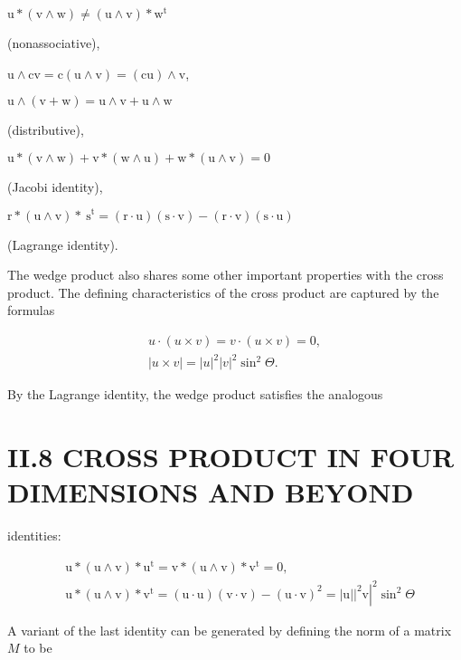 \begin{CJK}{UTF8}{gbsn}
$\mathrm{u} *(\mathrm{v} \wedge \mathrm{w}) \neq(\mathrm{u} \wedge \mathrm{v}) * \mathrm{w}^{\mathrm{t}}$

(nonassociative),

$\mathrm{u} \wedge \mathrm{cv}=\mathrm{c}(\mathrm{u} \wedge \mathrm{v})=(\mathrm{cu}) \wedge \mathrm{v}$,

$\mathrm{u} \wedge(\mathrm{v}+\mathrm{w})=\mathrm{u} \wedge \mathrm{v}+\mathrm{u} \wedge \mathrm{w}$

(distributive),

$\mathrm{u} *(\mathrm{v} \wedge \mathrm{w})+\mathrm{v} *(\mathrm{w} \wedge \mathrm{u})+\mathrm{w} *(\mathrm{u} \wedge \mathrm{v})=0$

(Jacobi identity),

$\mathrm{r} *(\mathrm{u} \wedge \mathrm{v}) * \mathrm{~s}^{\mathrm{t}}=(\mathrm{r} \cdot \mathrm{u})(\mathrm{s} \cdot \mathrm{v})-(\mathrm{r} \cdot \mathrm{v})(\mathrm{s} \cdot \mathrm{u})$

(Lagrange identity).

The wedge product also shares some other important properties with the cross product. The defining characteristics of the cross product are captured by the formulas

$$
\begin{gathered}
u \cdot(u \times v)=v \cdot(u \times v)=0, \\
|u \times v|=|u|^{2}|v|^{2} \sin ^{2} \Theta .
\end{gathered}
$$

By the Lagrange identity, the wedge product satisfies the analogous

\section{II.8 CROSS PRODUCT IN FOUR DIMENSIONS AND BEYOND}
identities:

$$
\begin{aligned}
&\mathrm{u} *(\mathrm{u} \wedge \mathrm{v}) * \mathrm{u}^{\mathrm{t}}=\mathrm{v} *(\mathrm{u} \wedge \mathrm{v}) * \mathrm{v}^{\mathrm{t}}=0, \\
&\mathrm{u} *(\mathrm{u} \wedge \mathrm{v}) * \mathrm{v}^{\mathrm{t}}=(\mathrm{u} \cdot \mathrm{u})(\mathrm{v} \cdot \mathrm{v})-(\mathrm{u} \cdot \mathrm{v})^{2}=\left.\left.|\mathrm{u}|\right|^{2} \mathrm{v}\right|^{2} \sin ^{2} \Theta
\end{aligned}
$$

A variant of the last identity can be generated by defining the norm of a matrix $M$ to be


\end{CJK}
